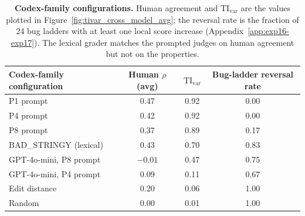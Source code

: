 \begin{table}[t]
  \centering
  \small
  \begin{tabular}{lccc}
    \toprule
    \textbf{Codex-family configuration} & \textbf{Human \(\rho\) (avg)} & \(\mathrm{TI}_{\mathrm{var}}\) & \textbf{Bug-ladder reversal rate} \\
    \midrule
    P1 prompt                          & 0.47                         & 0.92                          & 0.00                              \\
    P4 prompt                          & 0.42                         & 0.92                          & 0.00                              \\
    P8 prompt                          & 0.37                         & 0.89                          & 0.17                              \\
    BAD\_STRINGY (lexical)             & 0.43                         & 0.70                          & 0.83                              \\
    GPT-4o-mini, P8 prompt             & \(-0.01\)                    & 0.47                          & 0.75                              \\
    GPT-4o-mini, P4 prompt             & 0.09                         & 0.11                          & 0.67                              \\
    Edit distance                      & 0.20                         & 0.06                          & 1.00                              \\
    Random                             & 0.00                         & 0.01                          & 1.00                              \\
    \bottomrule
  \end{tabular}
  \caption{\textbf{Codex-family configurations.} Human agreement and \(\mathrm{TI}_{\mathrm{var}}\) are the values plotted in Figure~\ref{fig:tivar_cross_model_avg}; the reversal rate is the fraction of 24 bug ladders with at least one local score increase (Appendix~\ref{app:exp16-exp17}).
  The lexical grader matches the prompted judges on human agreement but not on the properties.}
  \label{tab:codex_configs}
\end{table}

